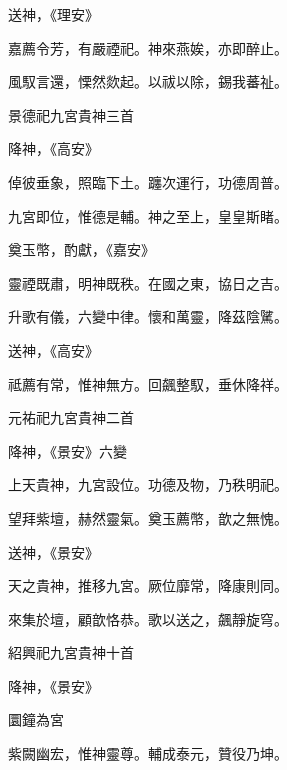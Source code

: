 \begin{pinyinscope}
 送神，《理安》



 嘉薦令芳，有嚴禋祀。神來燕娭，亦即醉止。



 風馭言還，慄然欻起。以祓以除，錫我蕃祉。



 景德祀九宮貴神三首



 降神，《高安》



 倬彼垂象，照臨下土。躔次運行，功德周普。



 九宮即位，惟德是輔。神之至上，皇皇斯睹。



 奠玉幣，酌獻，《嘉安》



 靈禋既肅，明神既秩。在國之東，協日之吉。



 升歌有儀，六變中律。懷和萬靈，降茲陰騭。



 送神，《高安》



 祗薦有常，惟神無方。回飆整馭，垂休降祥。



 元祐祀九宮貴神二首



 降神，《景安》六變



 上天貴神，九宮設位。功德及物，乃秩明祀。



 望拜紫壇，赫然靈氣。奠玉薦幣，歆之無愧。



 送神，《景安》



 天之貴神，推移九宮。厥位靡常，降康則同。



 來集於壇，顧歆恪恭。歌以送之，飆靜旋穹。



 紹興祀九宮貴神十首



 降神，《景安》



 圜鐘為宮



 紫闕幽宏，惟神靈尊。輔成泰元，贊役乃坤。




\end{pinyinscope}
